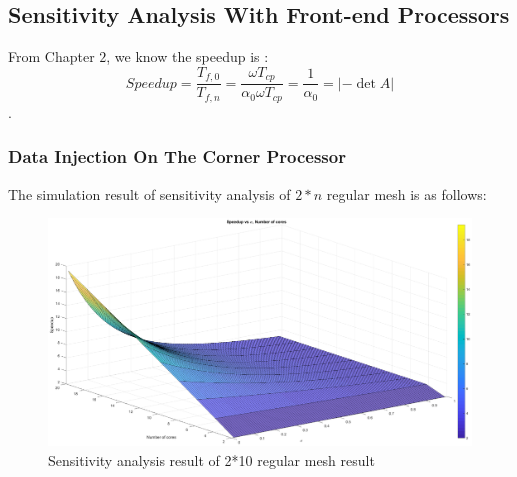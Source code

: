 \subsection{Sensitivity Analysis With Front-end Processors}
From Chapter $2$, we know the speedup is :
$$Speedup = \frac{T_{f, 0}}{T_{f, n}}= \frac{\omega T_{cp}}{\alpha_{0}\omega T_{cp}} = \frac{1}{\alpha_{0}} = \left |-\det A \right |$$.
\subsubsection{Data Injection On The Corner Processor}
The simulation result of sensitivity analysis of $2*n$ regular mesh  is as follows:
\begin{figure}[!ht]
\centering
\includegraphics[width=1\columnwidth]{figure/sa2t10c.eps}
\caption{Sensitivity analysis result of 2*10 regular mesh result}
\label{fig:sa2t10c}
\end{figure}

\newpage
